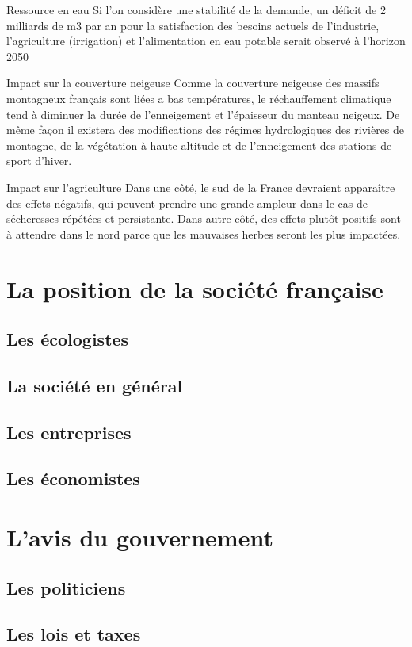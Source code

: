 \documentclass[a4paper,11pt]{article}
\begin{document}
Ressource en eau
Si l’on considère une stabilité de la demande, un déficit de 2 milliards de m3
par an pour la satisfaction des besoins actuels de l’industrie, l’agriculture (irrigation) et l’alimentation en eau potable serait observé à l’horizon 2050

Impact sur la couverture neigeuse
Comme la couverture neigeuse des massifs montagneux français sont liées a bas températures, le réchauffement climatique tend à diminuer la durée de l’enneigement et l’épaisseur du manteau neigeux. De même façon il existera  des modifications des régimes hydrologiques des rivières de montagne, de la végétation à haute altitude et de l’enneigement des stations de sport d’hiver. 

Impact sur l’agriculture
Dans une côté, le sud de la France  devraient apparaître des effets négatifs, qui peuvent prendre une grande ampleur dans le cas de sécheresses répétées et persistante. Dans autre côté, des effets plutôt positifs sont à attendre dans le nord parce que les mauvaises herbes seront les plus impactées.


\section{La position de la société française}
\subsection{Les écologistes}
\subsection{La société en général} 
\subsection{Les entreprises}
\subsection{Les économistes} 


\section{L’avis du gouvernement}
\subsection{Les politiciens}
\subsection{Les lois et taxes}
\end{document}
